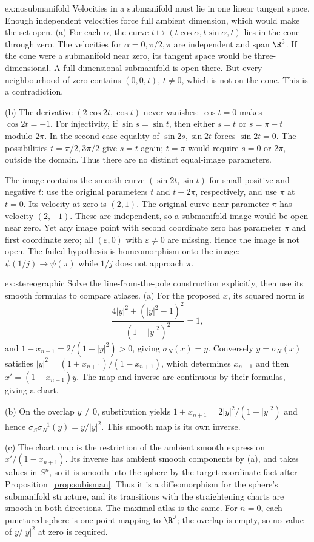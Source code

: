 \begin{solution}{ex:nosubmanifold}
\idea Velocities in a submanifold must lie in one linear tangent space. Enough independent velocities force full ambient dimension, which would make the set open.
\writeup (a) For each $\alpha$, the curve $t\mapsto(t\cos\alpha,t\sin\alpha,t)$ lies in the cone through zero. The velocities for $\alpha=0,\pi/2,\pi$ are independent and span $\R^3$. If the cone were a submanifold near zero, its tangent space would be three-dimensional. A full-dimensional submanifold is open there. But every neighbourhood of zero contains $(0,0,t)$, $t\ne0$, which is not on the cone. This is a contradiction.

(b) The derivative $(2\cos2t,\cos t)$ never vanishes: $\cos t=0$ makes $\cos2t=-1$. For injectivity, if $\sin s=\sin t$, then either $s=t$ or $s=\pi-t$ modulo $2\pi$. In the second case equality of $\sin2s,\sin2t$ forces $\sin2t=0$. The possibilities $t=\pi/2,3\pi/2$ give $s=t$ again; $t=\pi$ would require $s=0$ or $2\pi$, outside the domain. Thus there are no distinct equal-image parameters.

The image contains the smooth curve $(\sin2t,\sin t)$ for small positive and negative $t$: use the original parameters $t$ and $t+2\pi$, respectively, and use $\pi$ at $t=0$. Its velocity at zero is $(2,1)$. The original curve near parameter $\pi$ has velocity $(2,-1)$. These are independent, so a submanifold image would be open near zero. Yet any image point with second coordinate zero has parameter $\pi$ and first coordinate zero; all $(\varepsilon,0)$ with $\varepsilon\ne0$ are missing. Hence the image is not open. The failed hypothesis is homeomorphism onto the image: $\psi(1/j)\to\psi(\pi)$ while $1/j$ does not approach $\pi$.
\end{solution}

\begin{solution}{ex:stereographic}
\idea Solve the line-from-the-pole construction explicitly, then use its smooth formulas to compare atlases.
\writeup (a) For the proposed $x$, its squared norm is
\[
\frac{4|y|^2+(|y|^2-1)^2}{(1+|y|^2)^2}=1,
\]
and $1-x_{n+1}=2/(1+|y|^2)>0$, giving $\sigma_N(x)=y$. Conversely $y=\sigma_N(x)$ satisfies
$|y|^2=(1+x_{n+1})/(1-x_{n+1})$, which determines $x_{n+1}$ and then $x'=(1-x_{n+1})y$. The map and inverse are continuous by their formulas, giving a chart.

(b) On the overlap $y\ne0$, substitution yields $1+x_{n+1}=2|y|^2/(1+|y|^2)$ and hence $\sigma_S\sigma_N^{-1}(y)=y/|y|^2$. This smooth map is its own inverse.

(c) The chart map is the restriction of the ambient smooth expression $x'/(1-x_{n+1})$. Its inverse has ambient smooth components by (a), and takes values in $S^n$, so it is smooth into the sphere by the target-coordinate fact after Proposition~\ref{prop:subisman}. Thus it is a diffeomorphism for the sphere's submanifold structure, and its transitions with the straightening charts are smooth in both directions. The maximal atlas is the same. For $n=0$, each punctured sphere is one point mapping to $\R^0$; the overlap is empty, so no value of $y/|y|^2$ at zero is required.
\end{solution}

